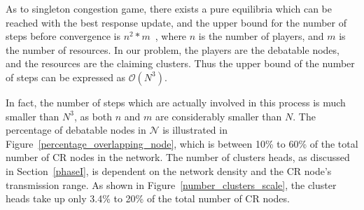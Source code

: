 \documentclass[10pt,journal,compsoc]{IEEEtran}
\theoremstyle{mytheoremstyle}
\theoremstyle{mytheoremstyle}
\theoremstyle{mytheoremstyle}
\begin{document}
As to singleton congestion game, there exists a pure equilibria which can be reached with the best response update, and the upper bound for the number of steps before convergence is $n^2*m$~\cite{Ackermann06purenash}, where $n$ is the number of players, and $m$ is the number of resources.
In our problem, the players are the debatable nodes, and the resources are the claiming clusters.
Thus the upper bound of the number of steps can be expressed as $\mathcal{O}(N^3)$.

In fact, the number of steps which are actually involved in this process is much smaller than $N^3$, as both $n$ and $m$ are considerably smaller than $N$.
The percentage of debatable nodes in $\mathcal{N}$ is illustrated in Figure~\ref{percentage_overlapping_node}, which is between 10\% to 60\% of the total number of CR nodes in the network.
The number of clusters heads, as discussed in Section~\ref{phaseI}, is dependent on the network density and the CR node's transmission range.
As shown in Figure~\ref{number_clusters_scale}, the cluster heads take up only 3.4\% to 20\% of the total number of CR nodes.



\end{document}
